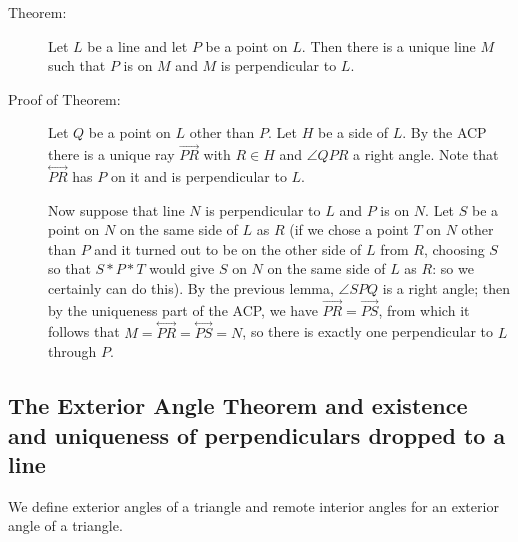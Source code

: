 \documentclass[12pt]{article}
\newcommand\Line[1]{\overset{\leftrightarrow}{#1}}
\begin{document}
\begin{description}
\item[Theorem:]  Let $L$ be a line and let $P$ be a point on $L$.  Then there is a unique line $M$ such that $P$ is on $M$ and $M$ is perpendicular to $L$.

\item[Proof of Theorem:]  Let $Q$ be a point on $L$ other than $P$.  Let $H$ be a side of $L$.  By the ACP there is a unique ray $\overrightarrow{PR}$ with $R \in H$ and $\angle QPR$ a right angle.  Note that $\Line{PR}$ has $P$ on it and is perpendicular to $L$.

Now suppose that line $N$ is perpendicular to $L$ and $P$ is on $N$.  Let $S$ be a point on $N$ on the same side of $L$ as $R$ (if we chose a point $T$ on $N$ other than $P$ and it turned out to be on the other side of $L$ from $R$, choosing $S$ so that $S*P*T$ would give $S$ on $N$ on the same side of $L$ as $R$:  so we certainly can do this).   By the previous lemma, $\angle SPQ$ is a right angle;  then by the uniqueness part of the ACP, we have $\overrightarrow{PR}=\overrightarrow{PS}$, from which it follows that
$M = \Line{PR} = \Line{PS} = N$, so there is exactly one perpendicular to $L$ through $P$.

\end{description}


\subsection{The Exterior Angle Theorem and existence and  uniqueness of perpendiculars dropped to a line}

We define exterior angles of a triangle and remote interior angles for an exterior angle of a triangle.
\end{document}
